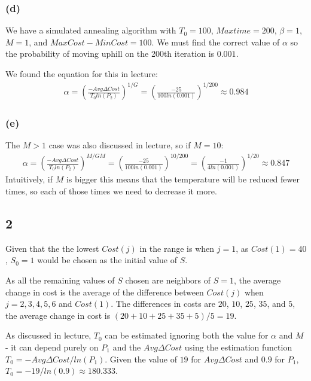 \documentclass[12pt]{article}
\begin{document}
\subsubsection{(d)}
We have a simulated annealing algorithm with $T_0 = 100$, $Maxtime = 200$, $\beta=1$, $M=1$, and $MaxCost - MinCost = 100$.  We must find the correct value of $\alpha$ so the probability of moving uphill on the 200th iteration is $0.001$.

We found the equation for this in lecture:
\begin{align*}
\alpha  = \left( \frac{-Avg\Delta Cost}{T_0 ln(P_2)} \right)^{1/G}
= \left( \frac{-25}{100 ln(0.001)} \right)^{1/200}
\approx 0.984
\end{align*}

\subsubsection{(e)}
The $M>1$ case was also discussed in lecture, so if $M=10$:
\begin{align*}
\alpha  = \left( \frac{-Avg\Delta Cost}{T_0 ln(P_2)} \right)^{M/GM}
= \left( \frac{-25}{100 ln(0.001)} \right)^{10/200}
= \left( \frac{-1}{4 ln(0.001)} \right)^{1/20}
\approx 0.847
\end{align*}
Intuitively, if $M$ is bigger this means that the temperature will be reduced fewer times, so each of those times we need to decrease it more.

\subsection{2}
Given that the the lowest $Cost(j)$ in the range is when $j = 1$, as $Cost(1) = 40$, $S_0 = 1$ would be chosen as the initial value of $S$. 

As all the remaining values of $S$ chosen are neighbors of $S = 1$, the average change in cost is the average of the difference between $Cost(j)$ when $j = 2,3,4,5,6$ and $Cost(1)$. The differences in costs are $20$, $10$, $25$, $35$, and $5$, the average change in cost is $(20 + 10 + 25 + 35 + 5) / 5 = 19$. 

As discussed in lecture, $T_0$ can be estimated ignoring both the value for $\alpha$ and $M$ - it can depend purely on $P_1$ and the $Avg\Delta Cost$ using the estimation function $T_0 = -Avg\Delta Cost / ln(P_1)$. Given the value of $19$ for $Avg\Delta Cost$ and $0.9$ for $P_1$, $T_0 = -19/ln(0.9) \approx 180.333$. 
\end{document}
